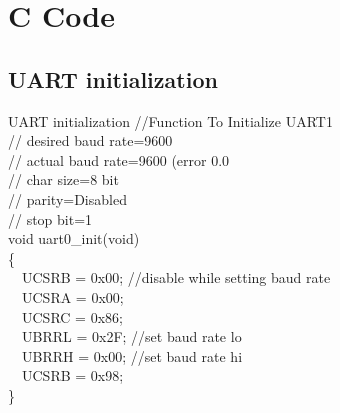 \documentclass[table,10pt,red]{beamer}	%
\begin{document}
\section{C Code}
\subsection{UART initialization}
	\begin{frame}
	\pause
		\begin{block}{UART initialization}
			\color{red} //Function To Initialize UART1
\\			// desired baud rate=9600
\\			// actual baud rate=9600 (error 0.0%
\\			// char size=8 bit
\\			// parity=Disabled
\\			// stop bit=1 \color{black}
\\			void uart0\_init(void)
\\			\{
\\			\ \ 	 UCSRB = 0x00;\color{red} //disable while setting baud rate\color{black}
\\			\ \ 	 UCSRA = 0x00;
\\			\ \ 	 UCSRC = 0x86;
\\			\ \ 	 UBRRL = 0x2F;\color{red} //set baud rate lo  \color{black}
\\			\ \ 	 UBRRH = 0x00;\color{red} //set baud rate hi\color{black}
\\			\ \ 	 UCSRB = 0x98; 
\\			\}
		\end{block}
	\end{frame}
	
\end{document}
